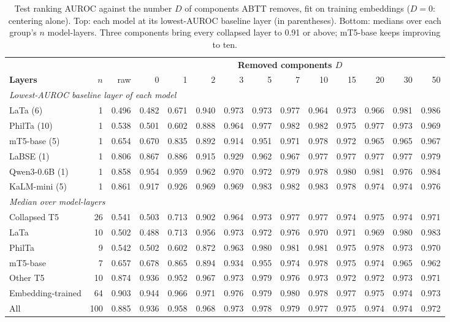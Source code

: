 \begin{table}[t]
\centering
\small
\setlength{\tabcolsep}{3.1pt}
\begin{tabular}{lrrrrrrrrrrrrr}
\toprule
& & & \multicolumn{11}{c}{\textbf{Removed components $D$}} \\
\cmidrule(lr){4-14}
\textbf{Layers} & $n$ & raw & 0 & 1 & 2 & 3 & 5 & 7 & 10 & 15 & 20 & 30 & 50 \\
\midrule
\multicolumn{14}{l}{\emph{Lowest-AUROC baseline layer of each model}} \\
LaTa (6) & 1 & 0.496 & 0.482 & 0.671 & 0.940 & 0.973 & 0.973 & 0.977 & 0.964 & 0.973 & 0.966 & 0.981 & 0.986 \\
PhilTa (10) & 1 & 0.538 & 0.501 & 0.602 & 0.888 & 0.964 & 0.977 & 0.982 & 0.982 & 0.975 & 0.977 & 0.973 & 0.969 \\
mT5-base (5) & 1 & 0.654 & 0.670 & 0.835 & 0.892 & 0.914 & 0.951 & 0.971 & 0.978 & 0.972 & 0.965 & 0.965 & 0.967 \\
LaBSE (1) & 1 & 0.806 & 0.867 & 0.886 & 0.915 & 0.929 & 0.962 & 0.967 & 0.977 & 0.977 & 0.977 & 0.977 & 0.979 \\
Qwen3-0.6B (1) & 1 & 0.858 & 0.954 & 0.959 & 0.962 & 0.970 & 0.972 & 0.979 & 0.978 & 0.980 & 0.981 & 0.976 & 0.984 \\
KaLM-mini (5) & 1 & 0.861 & 0.917 & 0.926 & 0.969 & 0.969 & 0.983 & 0.982 & 0.983 & 0.978 & 0.974 & 0.974 & 0.976 \\
\midrule
\multicolumn{14}{l}{\emph{Median over model-layers}} \\
Collapsed T5 & 26 & 0.541 & 0.503 & 0.713 & 0.902 & 0.964 & 0.973 & 0.977 & 0.977 & 0.974 & 0.975 & 0.974 & 0.971 \\
\quad LaTa & 10 & 0.502 & 0.488 & 0.713 & 0.956 & 0.973 & 0.972 & 0.976 & 0.970 & 0.971 & 0.969 & 0.980 & 0.983 \\
\quad PhilTa & 9 & 0.542 & 0.502 & 0.602 & 0.872 & 0.963 & 0.980 & 0.981 & 0.981 & 0.975 & 0.978 & 0.973 & 0.970 \\
\quad mT5-base & 7 & 0.657 & 0.678 & 0.865 & 0.894 & 0.934 & 0.955 & 0.974 & 0.978 & 0.975 & 0.974 & 0.965 & 0.962 \\
Other T5 & 10 & 0.874 & 0.936 & 0.952 & 0.967 & 0.973 & 0.979 & 0.976 & 0.973 & 0.972 & 0.972 & 0.973 & 0.971 \\
Embedding-trained & 64 & 0.903 & 0.944 & 0.966 & 0.971 & 0.976 & 0.979 & 0.980 & 0.978 & 0.977 & 0.975 & 0.974 & 0.973 \\
All & 100 & 0.885 & 0.936 & 0.958 & 0.968 & 0.973 & 0.978 & 0.979 & 0.977 & 0.975 & 0.974 & 0.974 & 0.972 \\
\bottomrule
\end{tabular}
\caption{Test ranking AUROC against the number $D$ of components ABTT removes, fit on training embeddings ($D=0$: centering alone). Top: each model at its lowest-AUROC baseline layer (in parentheses). Bottom: medians over each group's $n$ model-layers. Three components bring every collapsed layer to 0.91 or above; mT5-base keeps improving to ten.}
\label{tab:d_ablation}
\end{table}
